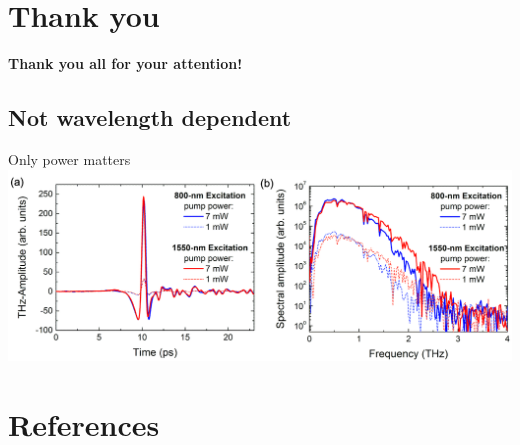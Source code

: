 \documentclass[aspectratio=1610, 9pt]{beamer}
\begin{document}
\section*{Thank you}
\begin{frame}{}
  \begin{center}
  \textbf{\textcolor{tugreen}{Thank you all for your attention!}}
  \end{center}
\end{frame}

\subsection*{Not wavelength dependent}
\begin{frame}{Only power matters}
\includegraphics[width=\textwidth]{pics/wavelength.png}
\end{frame}

\section{References }
\printbibliography
\end{document}
